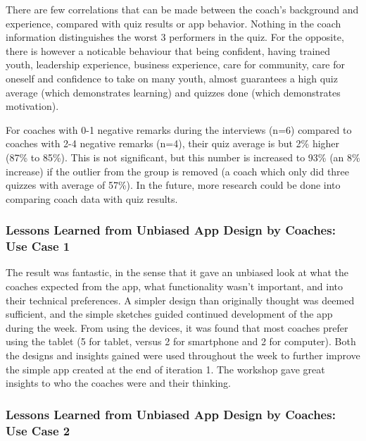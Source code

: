     There are few correlations that can be made between the coach's background and experience, compared with quiz results or app behavior. Nothing in the coach information distinguishes the worst 3 performers in the quiz. For the opposite, there is however a noticable behaviour that being confident, having trained youth, leadership experience, business experience, care for community, care for oneself and confidence to take on many youth, almost guarantees a high quiz average (which demonstrates learning) and quizzes done (which demonstrates motivation).

    For coaches with 0-1 negative remarks during the interviews (n=6) compared to coaches with 2-4 negative remarks (n=4), their quiz average is but 2\% higher (87\% to 85\%). This is not significant, but this number is increased to 93\% (an 8\% increase) if the outlier from the group is removed (a coach which only did three quizzes with average of 57\%). In the future, more research could be done into comparing coach data with quiz results.


    \subsubsection{Lessons Learned from Unbiased App Design by Coaches: Use Case 1}

    The result was fantastic, in the sense that it gave an unbiased look at what the coaches expected from the app, what functionality wasn't important, and into their technical preferences. A simpler design than originally thought was deemed sufficient, and the simple sketches guided continued development of the app during the week. From using the devices, it was found that most coaches prefer using the tablet (5 for tablet, versus 2 for smartphone and 2 for computer). Both the designs and insights gained were used throughout the week to further improve the simple app created at the end of iteration 1. The workshop gave great insights to who the coaches were and their thinking. 

    \subsubsection{Lessons Learned from Unbiased App Design by Coaches: Use Case 2}

